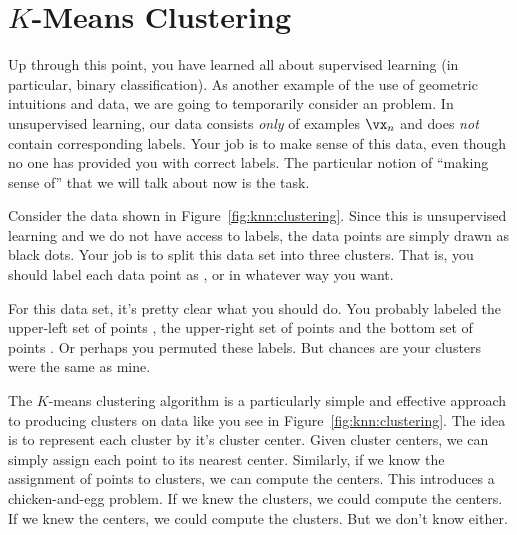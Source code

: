 
\section[K-Means Clustering]{$K$-Means Clustering}
\label{sec:knn:kmeans}

Up through this point, you have learned all about supervised learning
(in particular, binary classification).  As another example of the use
of geometric intuitions and data, we are going to temporarily consider
an  problem.  In unsupervised learning,
our data consists \emph{only} of examples $\vx_n$ and does \emph{not}
contain corresponding labels.  Your job is to make sense of this data,
even though no one has provided you with correct labels.  The
particular notion of ``making sense of'' that we will talk about now
is the  task.


Consider the data shown in Figure~\ref{fig:knn:clustering}.  Since
this is unsupervised learning and we do not have access to labels, the
data points are simply drawn as black dots.  Your job is to split this
data set into three clusters.  That is, you should label each data
point as ,  or  in whatever way you want.

For this data set, it's pretty clear what you should do.  You probably
labeled the upper-left set of points , the upper-right set of
points  and the bottom set of points .  Or perhaps
you permuted these labels.  But chances are your clusters were the
same as mine.

The $K$-means clustering algorithm is a particularly simple and
effective approach to producing clusters on data like you see in
Figure~\ref{fig:knn:clustering}.  The idea is to represent each
cluster by it's cluster center.  Given cluster centers, we can simply
assign each point to its nearest center.  Similarly, if we know the
assignment of points to clusters, we can compute the centers.  This
introduces a chicken-and-egg problem.  If we knew the clusters, we
could compute the centers.  If we knew the centers, we could compute
the clusters.  But we don't know either.


